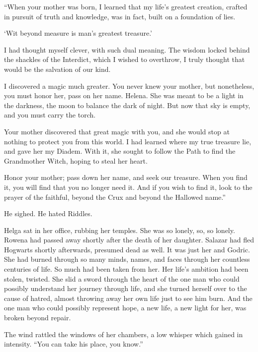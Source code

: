 \begin{writtenNote}
“When your mother was born, I learned that my life’s greatest creation, crafted in pursuit of truth and knowledge, was in fact, built on a foundation of lies.

‘Wit beyond measure is man’s greatest treasure.’

I had thought myself clever, with such dual meaning. The wisdom locked behind the shackles of the Interdict, which I wished to overthrow, I truly thought that would be the salvation of our kind.

I discovered a magic much greater. You never knew your mother, but nonetheless, you must honor her, pass on her name. Helena. She was meant to be a light in the darkness, the moon to balance the dark of night. But now that sky is empty, and you must carry the torch.

Your mother discovered that great magic with you, and she would stop at nothing to protect you from this world. I had learned where my true treasure lie, and gave her my Diadem. With it, she sought to follow the Path to find the Grandmother Witch, hoping to steal her heart.

Honor your mother; pass down her name, and seek our treasure. When you find it, you will find that you no longer need it. And if you wish to find it, look to the prayer of the faithful, beyond the Crux and beyond the Hallowed name.”
\end{writtenNote}

\noindent He sighed. He hated Riddles.
\simpleline
{}

Helga sat in her office, rubbing her temples. She was so lonely, so, so lonely. Rowena had passed away shortly after the death of her daughter. Salazar had fled Hogwarts shortly afterwards, presumed dead as well. It was just her and Godric.
\SmallVSpace
She had burned through so many minds, names, and faces through her countless centuries of life. So much had been taken from her. Her life’s ambition had been stolen, twisted. She slid a sword through the heart of the one man who could possibly understand her journey through life, and she turned herself over to the cause of hatred, almost throwing away her own life just to see him burn. And the one man who could possibly represent hope, a new life, a new light for her, was broken beyond repair.
\pagebreak

The wind rattled the windows of her chambers, a low whisper which gained in intensity. “You can take his place, you know.”


